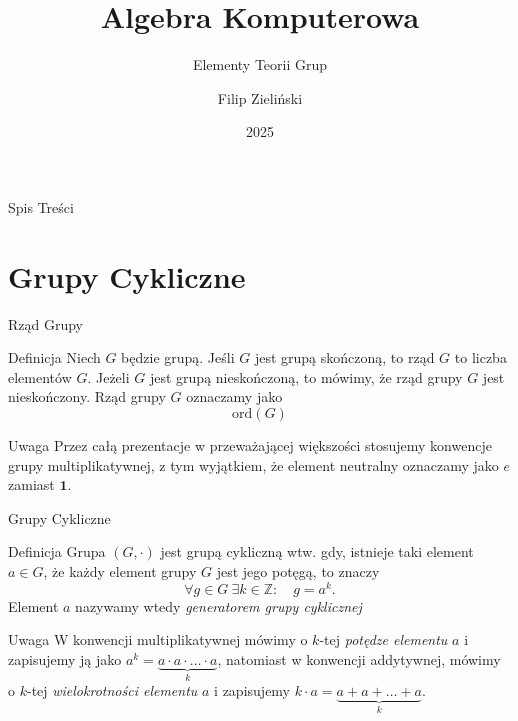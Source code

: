 \documentclass{beamer}
\title{Algebra Komputerowa}
\subtitle{Elementy Teorii Grup}
\author{Filip Zieli\'nski}
\date{2025}
\newcommand{\one}{\mathbf{1}}
\newcommand{\ord}{\textrm{ord}}
\begin{document}
\begin{frame}
    \titlepage
\end{frame}
 
\begin{frame}{Spis Treści}
    \tableofcontents
\end{frame}

\section{Grupy Cykliczne}

\begin{frame}{Rząd Grupy}
    \begin{block}{Definicja}
        Niech $G$ będzie grupą. Jeśli $G$ jest grupą skończoną, to rząd $G$ to liczba elementów $G$.
        Jeżeli $G$ jest grupą nieskończoną, to mówimy, że rząd grupy $G$ jest nieskończony. Rząd grupy $G$ oznaczamy jako
        $$\ord(G)$$
    \end{block}
    \pause 
    \begin{alertblock}{Uwaga}
        Przez całą prezentacje w przeważającej większości stosujemy konwencje grupy multiplikatywnej, z tym wyjątkiem, że element neutralny oznaczamy jako $e$ zamiast $\one$.
    \end{alertblock}
\end{frame}

\begin{frame}{Grupy Cykliczne}
    \begin{block}{Definicja}
        Grupa $(G,\cdot)$ jest \alert{grupą cykliczną} wtw. gdy, istnieje taki element $a \in G$, że każdy element grupy $G$
        jest jego potęgą, to znaczy
        $$\forall g \in G \ \exists k \in \mathbb{Z}  : \quad g = a^k .$$
        Element $a$ nazywamy wtedy \textit{generatorem grupy cyklicznej}
    \end{block}
    \begin{alertblock}{Uwaga}
        W konwencji multiplikatywnej mówimy o $k$-tej \textit{potędze elementu} $a$ i zapisujemy ją jako
        $a^k = \underbrace{a \cdot a \cdot \ldots \cdot a}_{k}$, natomiast w konwencji addytywnej, mówimy o
        $k$-tej \textit{wielokrotności elementu} $a$ i zapisujemy $k \cdot a = \underbrace{a + a + \ldots + a}_{k}$.
    \end{alertblock}

\end{frame}
\end{document}
